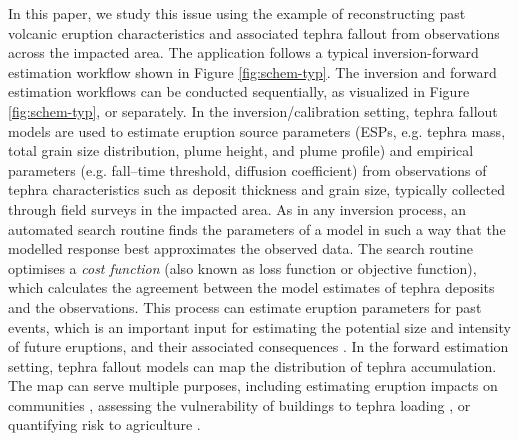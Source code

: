 In this paper, we study this issue using the example of reconstructing past volcanic eruption characteristics and associated tephra fallout from observations across the impacted area. The application follows a typical inversion-forward estimation workflow shown in Figure \ref{fig:schem-typ}. The inversion and forward estimation workflows can be conducted sequentially, as visualized in Figure \ref{fig:schem-typ}, or separately. In the inversion/calibration setting, tephra fallout models are used to estimate eruption source parameters (ESPs, e.g. tephra mass, total grain size distribution, plume height, and plume profile) and empirical parameters (e.g. fall–time threshold, diffusion coefficient) from observations of tephra characteristics such as deposit thickness and grain size, typically collected through field surveys in the impacted area. As in any inversion process, an automated search routine finds the parameters of a model in such a way that the modelled response best approximates the observed data. The search routine optimises a \textit{cost function} (also known as loss function or objective function), which calculates the agreement between the model estimates of tephra deposits and the observations. This process can estimate eruption parameters for past events, which is an important input for estimating the potential size and intensity of future eruptions, and their associated consequences \citep{newhall1982volcanic, carey1986quantitative, pieri1986eruption, armienti1988numerical, scarpati1993neapolitan, mastin2009multidisciplinary, stohl2011determination, pouget2013estimation, madankan2014computation, bear2020automated}. In the forward estimation setting, tephra fallout models can map the distribution of tephra accumulation. The map can serve multiple purposes, including estimating eruption impacts on communities \citep{le2012, wardman2012, magill2013, biass2017}, assessing the vulnerability of buildings to tephra loading \citep{williams2020, HAYES2019142, spence2005}, or quantifying risk to agriculture \citep{gomez2006, ayris2012, thompson2017}. 

